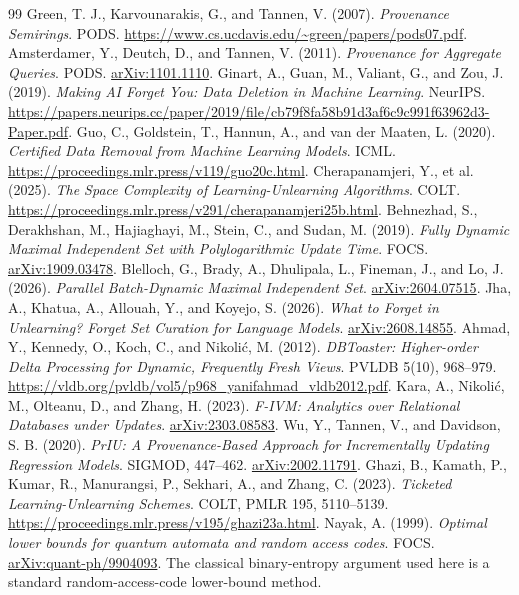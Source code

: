 \documentclass[11pt,a4paper]{article}
\theoremstyle{definition}\newtheorem{definition}[theorem]{Definition}
\begin{document}
\begin{thebibliography}{99}
 Green, T. J., Karvounarakis, G., and Tannen, V. (2007). \emph{Provenance Semirings}. PODS. \url{https://www.cs.ucdavis.edu/~green/papers/pods07.pdf}.
 Amsterdamer, Y., Deutch, D., and Tannen, V. (2011). \emph{Provenance for Aggregate Queries}. PODS. \href{https://arxiv.org/abs/1101.1110}{arXiv:1101.1110}.
 Ginart, A., Guan, M., Valiant, G., and Zou, J. (2019). \emph{Making AI Forget You: Data Deletion in Machine Learning}. NeurIPS. \url{https://papers.neurips.cc/paper/2019/file/cb79f8fa58b91d3af6c9c991f63962d3-Paper.pdf}.
 Guo, C., Goldstein, T., Hannun, A., and van der Maaten, L. (2020). \emph{Certified Data Removal from Machine Learning Models}. ICML. \url{https://proceedings.mlr.press/v119/guo20c.html}.
 Cherapanamjeri, Y., et al. (2025). \emph{The Space Complexity of Learning-Unlearning Algorithms}. COLT. \url{https://proceedings.mlr.press/v291/cherapanamjeri25b.html}.
 Behnezhad, S., Derakhshan, M., Hajiaghayi, M., Stein, C., and Sudan, M. (2019). \emph{Fully Dynamic Maximal Independent Set with Polylogarithmic Update Time}. FOCS. \href{https://arxiv.org/abs/1909.03478}{arXiv:1909.03478}.
 Blelloch, G., Brady, A., Dhulipala, L., Fineman, J., and Lo, J. (2026). \emph{Parallel Batch-Dynamic Maximal Independent Set}. \href{https://arxiv.org/abs/2604.07515}{arXiv:2604.07515}.
 Jha, A., Khatua, A., Allouah, Y., and Koyejo, S. (2026). \emph{What to Forget in Unlearning? Forget Set Curation for Language Models}. \href{https://arxiv.org/abs/2608.14855}{arXiv:2608.14855}.
 Ahmad, Y., Kennedy, O., Koch, C., and Nikoli\'{c}, M. (2012). \emph{DBToaster: Higher-order Delta Processing for Dynamic, Frequently Fresh Views}. PVLDB 5(10), 968--979. \url{https://vldb.org/pvldb/vol5/p968_yanifahmad_vldb2012.pdf}.
 Kara, A., Nikoli\'{c}, M., Olteanu, D., and Zhang, H. (2023). \emph{F-IVM: Analytics over Relational Databases under Updates}. \href{https://arxiv.org/abs/2303.08583}{arXiv:2303.08583}.
 Wu, Y., Tannen, V., and Davidson, S. B. (2020). \emph{PrIU: A Provenance-Based Approach for Incrementally Updating Regression Models}. SIGMOD, 447--462. \href{https://arxiv.org/abs/2002.11791}{arXiv:2002.11791}.
 Ghazi, B., Kamath, P., Kumar, R., Manurangsi, P., Sekhari, A., and Zhang, C. (2023). \emph{Ticketed Learning-Unlearning Schemes}. COLT, PMLR 195, 5110--5139. \url{https://proceedings.mlr.press/v195/ghazi23a.html}.
 Nayak, A. (1999). \emph{Optimal lower bounds for quantum automata and random access codes}. FOCS. \href{https://arxiv.org/abs/quant-ph/9904093}{arXiv:quant-ph/9904093}. The classical binary-entropy argument used here is a standard random-access-code lower-bound method.
\end{thebibliography}
\end{document}
